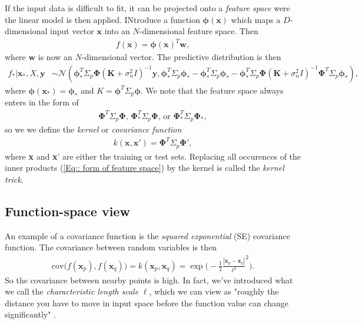 \documentclass[twoside,english]{uiofysmaster}
\begin{document}
If the input data is difficult to fit, it can be projected onto a \textit{feature space} were the linear model is then applied. INtroduce a function $\boldsymbol{\phi} (\textbf{x})$ which maps a $D$-dimensional input vector $\textbf{x}$ into an $N$-dimensional feature space. Then 
\begin{align}\label{Eq:: Gaussian linear feature space}
f(\textbf{x}) = \boldsymbol{\phi}(\textbf{x})^T \textbf{w},
\end{align}
where $\textbf{w}$ is now an $N$-dimensional vector. The predictive distribution is then 
\begin{align}\label{Eq:: Gaussian linear feature posterior dist}
f_*|\textbf{x}_*, X, \textbf{y} &\sim \mathcal{N}(\boldsymbol{\phi}_*^T \Sigma_p \boldsymbol{\Phi}(\textbf{K}+ \sigma_n^2I)^{-1} \textbf{y},\boldsymbol{\phi}_*^T \Sigma_p \boldsymbol{\phi}_* - \boldsymbol{\phi}_*^T \Sigma_p \boldsymbol{\phi}_* - \boldsymbol{\phi}_*^T \Sigma_p \boldsymbol{\Phi}(\textbf{K}+ \sigma_n^2I)^{-1} \boldsymbol{\Phi}^T \Sigma_p \boldsymbol{\phi}_*),
\end{align}
where $\boldsymbol{\phi}(\textbf{x}_*)=\boldsymbol{\phi}_*$ and $K=\boldsymbol{\phi}^T \Sigma_p \boldsymbol{\phi}$. We note that the feature space always enters in the form of
\begin{align}\label{Eq:: form of feature space}
\boldsymbol{\Phi}^T \Sigma_p \boldsymbol{\Phi} \text{, } \boldsymbol{\Phi}_*^T \Sigma_p \boldsymbol{\Phi} \text{, or } \boldsymbol{\Phi}_*^T \Sigma_p \boldsymbol{\Phi}_*,
\end{align}
so we we define the \textit{kernel} or \textit{covariance function}
\begin{align}\label{Eq:: Gaussian linear kernel}
k(\textbf{x}, \textbf{x}') = \boldsymbol{\Phi}^T \Sigma_p \boldsymbol{\Phi'},
\end{align}
where \textbf{x} and \textbf{x}' are either the training or test sets. Replacing all occurences of the inner products (\ref{Eq:: form of feature space}) by the kernel is called the \textit{kernel trick}.

\subsection{Function-space view}

An example of a covariance function is the \textit{squared exponential} (SE) covariance function. The covariance between random variables is then 
\begin{align}\label{Eq:: squared exponential cov func}
\text{cov} \big(f(\textbf{x}_p), f(\textbf{x}_q) \big) = k(\textbf{x}_p, \textbf{x}_q) = \exp \Big(- \frac{1}{2} \frac{|\textbf{x}_p - \textbf{x}_q|}{\ell^2}^2 \Big).
\end{align}
So the covariance between nearby points is high. In fact, we've introduced what we call the \textit{characteristic length scale} $\ell$, which we can view as "roughly the distance you have to move in input space before the function value can change significantly" \cite{rasmussen2006gaussian}.
\end{document}
